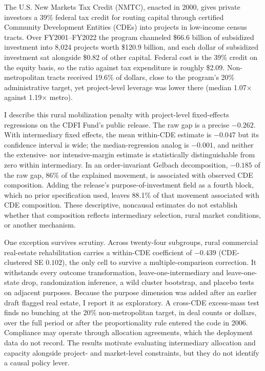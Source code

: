 \noindent
The U.S. New Markets Tax Credit (NMTC), enacted in 2000, gives private
investors a 39\% federal tax credit for routing capital through certified
Community Development Entities (CDEs) into projects in low-income census
tracts. Over FY2001--FY2022 the program channeled \$66.6 billion of
subsidized investment into 8{,}024 projects worth \$120.9 billion, and each
dollar of subsidized investment sat alongside \$0.82 of other capital.
Federal cost is the 39\% credit on the equity basis, so the ratio against
tax expenditure is roughly \$2.09. Non-metropolitan tracts received 19.6\%
of dollars, close to the program's 20\% administrative target, yet
project-level leverage was lower there (median 1.07$\times$ against
1.19$\times$ metro).

I describe this rural mobilization penalty with project-level fixed-effects
regressions on the CDFI Fund's public release. The raw gap is a precise
$-0.262$. With intermediary fixed effects, the mean within-CDE estimate is
$-0.047$ but its confidence interval is wide; the median-regression analog
is $-0.001$, and neither the extensive- nor intensive-margin estimate is
statistically distinguishable from zero within intermediary. In an
order-invariant Gelbach decomposition, $-0.185$ of the raw gap, 86\% of the
explained movement, is associated with observed CDE composition. Adding the
release's purpose-of-investment field as a fourth block, which no prior
specification used, leaves 88.1\% of that movement associated with CDE
composition. These descriptive, noncausal estimates do not establish
whether that composition reflects intermediary selection, rural market
conditions, or another mechanism.

One exception survives scrutiny. Across twenty-four subgroups, rural
commercial real-estate rehabilitation carries a within-CDE coefficient of
$-0.439$ (CDE-clustered SE $0.102$), the only cell to survive a
multiple-comparison correction. It withstands every outcome transformation,
leave-one-intermediary and leave-one-state drop, randomization inference, a
wild cluster bootstrap, and placebo tests on adjacent purposes. Because the
purpose dimension was added after an earlier draft flagged real estate, I
report it as exploratory. A cross-CDE excess-mass test finds no bunching at
the 20\% non-metropolitan target, in deal counts or dollars, over the full
period or after the proportionality rule entered the code in 2006.
Compliance may operate through allocation agreements, which the deployment
data do not record. The results motivate evaluating intermediary allocation
and capacity alongside project- and market-level constraints, but they do
not identify a causal policy lever.
